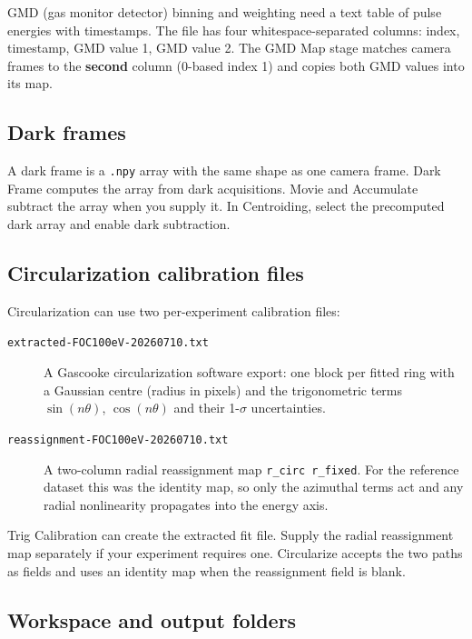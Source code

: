 \documentclass[11pt,a4paper]{article}
\newcommand{\code}[1]{\texttt{#1}}
\begin{document}
GMD (gas monitor detector) binning and weighting need a text table of pulse
energies with timestamps. The file has four whitespace-separated columns:
index, timestamp, GMD value 1, GMD value 2. The GMD Map stage matches camera
frames to the \textbf{second} column (0-based index 1) and copies both GMD
values into its map.

\subsection{Dark frames}
\label{sec:darkdata}

A dark frame is a \code{.\allowbreak{}npy} array with the same shape as one
camera frame. Dark Frame computes the array from dark acquisitions.
Movie and Accumulate subtract the array when you supply it.
In Centroiding, select the precomputed dark array and enable dark subtraction.

\subsection{Circularization calibration files}
\label{sec:calibfiles}

Circularization can use two per-experiment calibration files:

\begin{description}
  \item[\code{extracted-\allowbreak{}FOC100eV-\allowbreak{}20260710.\allowbreak{}txt}] A Gascooke circularization
    software export: one block per fitted ring with a Gaussian centre
    (radius in pixels) and the trigonometric terms
    $\sin(n\theta)$, $\cos(n\theta)$ and their 1-$\sigma$ uncertainties.
  \item[\code{reassignment-\allowbreak{}FOC100eV-\allowbreak{}20260710.\allowbreak{}txt}] A two-column radial
    reassignment map \code{r\_\allowbreak{}circ r\_\allowbreak{}fixed}. For the reference dataset
    this was the identity map, so only the azimuthal terms act and any
    radial nonlinearity propagates into the energy axis.
\end{description}

Trig Calibration can create the extracted fit file. Supply the radial
reassignment map separately if your experiment requires one.
Circularize accepts the two paths as fields and uses an identity map when
the reassignment field is blank.

\subsection{Workspace and output folders}
\label{sec:workspace}
\end{document}
